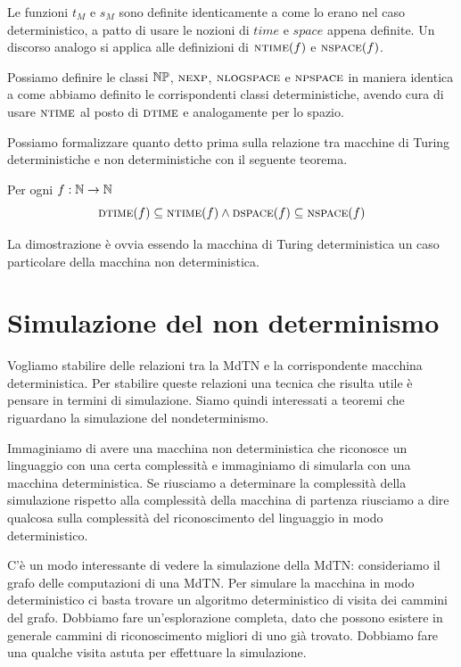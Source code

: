 Le funzioni $t_{M}$ e $s_{M}$ sono definite identicamente a come lo erano nel caso deterministico, a
patto di usare le nozioni di $\textit{time}$ e $\textit{space}$ appena definite. Un discorso analogo
si applica alle definizioni di $\textsc{ntime}(f)$ e $\textsc{nspace}(f)$.

Possiamo definire le classi $\mathbb{NP}$, $\textsc{nexp}$, $\textsc{nlogspace}$ e $\textsc{npspace}$ in maniera identica a
come abbiamo definito le corrispondenti classi deterministiche, avendo cura di usare $\textsc{ntime}$ al
posto di $\textsc{dtime}$ e analogamente per lo spazio.

Possiamo formalizzare quanto detto prima sulla relazione tra macchine di Turing deterministiche e
non deterministiche con il seguente teorema.
\begin{thm}
    Per ogni $f: \mathbb{N} \to \mathbb{N}$
    \begin{equation*}
        \textsc{dtime}(f) \subseteq \textsc{ntime}(f) \land \textsc{dspace}(f) \subseteq \textsc{nspace}(f)
    \end{equation*}
\end{thm}
La dimostrazione è ovvia essendo la macchina di Turing deterministica un caso particolare della
macchina non deterministica.


\section{Simulazione del non determinismo}

Vogliamo stabilire delle relazioni tra la MdTN e la corrispondente macchina deterministica. Per
stabilire queste relazioni una tecnica che risulta utile è pensare in termini di simulazione.
Siamo quindi interessati a teoremi che riguardano la simulazione del nondeterminismo.

Immaginiamo di avere una macchina non deterministica che riconosce un linguaggio con una certa
complessità e immaginiamo di simularla con una macchina deterministica. Se riusciamo a determinare
la complessità della simulazione rispetto alla complessità della macchina di partenza riusciamo a
dire qualcosa sulla complessità del riconoscimento del linguaggio in modo deterministico.

C'è un modo interessante di vedere la simulazione della MdTN: consideriamo il grafo delle
computazioni di una MdTN. Per simulare la macchina in modo deterministico ci basta trovare un
algoritmo deterministico di visita dei cammini del grafo. Dobbiamo fare un'esplorazione completa,
dato che possono esistere in generale cammini di riconoscimento migliori di uno già trovato.
Dobbiamo fare una qualche visita astuta per effettuare la simulazione.

